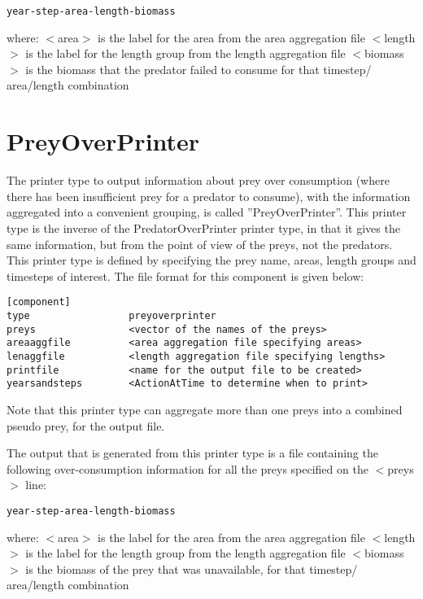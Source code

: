 \documentclass [a4paper, 10pt]{book}
\begin{document}
{\small\begin{verbatim}
year-step-area-length-biomass
\end{verbatim}}

where:\newline
$<$area$>$ is the label for the area from the area aggregation file\newline
$<$length$>$ is the label for the length group from the length aggregation file\newline
$<$biomass$>$ is the biomass that the predator failed to consume for that timestep/ area/length combination

\section{PreyOverPrinter}\label{sec:preyoverprinter}
The printer type to output information about prey over consumption (where there has been insufficient prey for a predator to consume), with the information aggregated into a convenient grouping, is called ''PreyOverPrinter''.  This printer type is the inverse of the PredatorOverPrinter printer type, in that it gives the same information, but from the point of view of the preys, not the predators.  This printer type is defined by specifying the prey name, areas, length groups and timesteps of interest.  The file format for this component is given below:

{\small\begin{verbatim}
[component]
type                 preyoverprinter
preys                <vector of the names of the preys>
areaaggfile          <area aggregation file specifying areas>
lenaggfile           <length aggregation file specifying lengths>
printfile            <name for the output file to be created>
yearsandsteps        <ActionAtTime to determine when to print>
\end{verbatim}}

Note that this printer type can aggregate more than one preys into a combined pseudo prey, for the output file.

\bigskip
The output that is generated from this printer type is a file containing the following over-consumption information for all the preys specified on the $<$preys$>$ line:

{\small\begin{verbatim}
year-step-area-length-biomass
\end{verbatim}}

where:\newline
$<$area$>$ is the label for the area from the area aggregation file\newline
$<$length$>$ is the label for the length group from the length aggregation file\newline
$<$biomass$>$ is the biomass of the prey that was unavailable, for that timestep/ area/length combination
\end{document}
